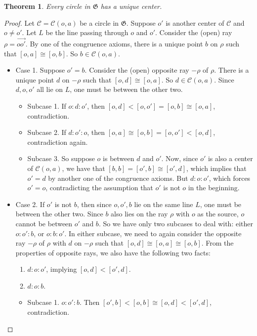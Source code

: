 \documentclass[12pt]{article}
\newtheorem{thm}{Theorem}
\newcommand{\ray}[1]{\overrightarrow{#1}}
\begin{document}
\begin{thm} Every circle in $\mathfrak{G}$ has a unique center. 
\end{thm}
\begin{proof}  Let $\mathscr{C}=\mathscr{C}(o,a)$ be a circle in $\mathfrak{G}$. 
 Suppose $o'$ is another center of $\mathscr{C}$ and $o\ne o'$.  Let $L$ be the line passing 
through $o$ and $o'$.  Consider the (open) ray $\rho = \ray{oo'}$.  By one of the congruence 
axioms, there is a unique point $b$ on $\rho$ such that $[o,a] \cong [o,b]$.   
 So $b\in \mathscr{C}(o,a)$.
\begin{itemize}
\item Case 1.  Suppose $o'=b$.  Consider the (open) opposite ray $-\rho$ of $\rho$.  
There is a unique point $d$ on $-\rho$ such that $[o,d]\cong [o,a]$.  So $d\in\mathscr{C}(o,a)$.  Since $d,o,o'$ all lie on $L$, one must be between the other two.
\begin{itemize}
\item
Subcase 1. If $o:d:o'$, then $[o,d] < [o,o'] = [o,b] \cong [o,a]$, contradiction.  
\item
Subcase 2. If $d:o':o$, then $[o,a] \cong [o,b] = [o,o'] < [o,d]$, contradiction again.  
\item
Subcase 3. So suppose $o$ is between $d$ and $o'$. Now, since $o'$ is also a center 
of $\mathscr{C}(o,a)$, we have that $[b,b] = [o',b] \cong [o',d]$, which implies that 
$o'=d$ by another one of the congruence axioms. But $d:o:o'$, which forces $o'=o$, contradicting the assumption that $o'$ is not $o$ in the beginning.
\end{itemize}
\item
Case 2.  If $o'$ is not $b$, then since $o,o',b$ lie on the same line $L$, one must be between the other two.  Since $b$ also lies on the ray $\rho$ with $o$ as the source, $o$ cannot be between $o'$ and $b$.  So we have only two subcases to deal with: either $o:o':b$, or $o:b:o'$.  In either subcase, we need to again consider the opposite ray $-\rho$ of $\rho$ with $d$ on $-\rho$ such that $[o,d]\cong [o,a] \cong [o,b]$.  
From the properties of opposite rays, we also have the following two facts:
\begin{enumerate}
\item $d:o:o'$, implying $[o,d] < [o',d]$.
\item $d:o:b$.
\end{enumerate}
\begin{itemize}
\item
Subcase 1.  $o:o':b$.  Then $[o',b] < [o,b] \cong [o,d] < [o',d]$, contradiction.

\end{itemize}
\end{itemize}
\end{proof}
\end{document}
